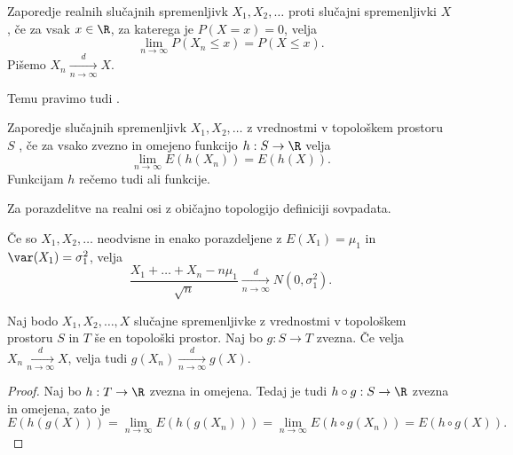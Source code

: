 
\begin{definicija}
  Zaporedje realnih slučajnih spremenljivk $X_1, X_2, \ldots$  proti slučajni spremenljivki $X$, če za vsak $x \in
  \R$, za katerega je $P(X = x) = 0$, velja
  \[
	\lim_{n \to \infty} P(X_n \le x) = P(X \le x).
  \]
  Pišemo $X_n \xrightarrow[n \to \infty]{d} X$.
\end{definicija}

\begin{opomba}
  Temu pravimo tudi .
\end{opomba}

\begin{definicija}
  Zaporedje slučajnih spremenljivk $X_1, X_2, \ldots$ z vrednostmi v topološkem
  prostoru $S$ , če za vsako zvezno
  in omejeno funkcijo $h: S \to \R$ velja
  \[
	\lim_{n \to \infty} E(h(X_n)) = E(h(X)).
  \]
  Funkcijam $h$ rečemo tudi  ali  funkcije.
\end{definicija}

\begin{izrek}
  Za porazdelitve na realni osi z običajno topologijo definiciji sovpadata.
\end{izrek}

\begin{izrek}
  Če so $X_1, X_2, \ldots$ neodvisne in enako porazdeljene z $E(X_1) = \mu_1$ in
  $\var(X_1) = \sigma_1^2$, velja
  \[
	\frac{X_1 + \ldots + X_n - n \mu_1}{\sqrt{n}} \xrightarrow[n\to \infty]{d}
	N(0, \sigma_1^2).
  \]
\end{izrek}


\begin{trditev}
  Naj bodo $X_1, X_2, \ldots, X$ slučajne spremenljivke z vrednostmi v
  topološkem prostoru $S$ in $T$ še en topološki prostor.
  Naj bo $g: S \to T$ zvezna.
  Če velja $X_n \xrightarrow[n \to \infty]{d} X$, velja tudi $g(X_n)
  \xrightarrow[n\to\infty]{d} g(X)$.
\end{trditev}

\begin{proof}
  Naj bo $h : T \to \R$ zvezna in omejena.
  Tedaj je tudi $h \circ g : S \to \R$ zvezna in omejena, zato je
  \[
	E(h(g(X))) = \lim_{n \to \infty} E(h(g(X_n))) = \lim_{n \to \infty} E(h
	\circ g(X_n)) = E(h \circ g(X)).
  \]
\end{proof}

